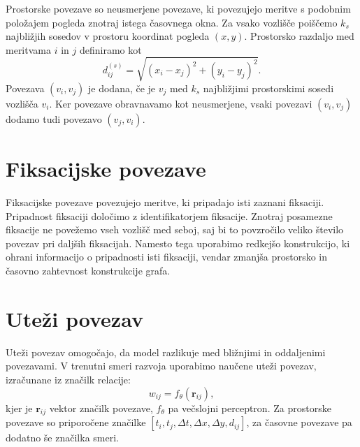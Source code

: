 Prostorske povezave so neusmerjene povezave, ki povezujejo meritve s podobnim položajem pogleda znotraj istega časovnega okna.
Za vsako vozlišče poiščemo $k_s$ najbližjih sosedov v prostoru koordinat pogleda $(x,y)$.
Prostorsko razdaljo med meritvama $i$ in $j$ definiramo kot
\begin{equation}
    d_{ij}^{(s)} =
    \sqrt{(x_i - x_j)^2 + (y_i - y_j)^2}.
\end{equation}
Povezava $(v_i, v_j)$ je dodana, če je $v_j$ med $k_s$ najbližjimi prostorskimi sosedi vozlišča $v_i$.
Ker povezave obravnavamo kot neusmerjene, vsaki povezavi $(v_i,v_j)$ dodamo tudi povezavo $(v_j,v_i)$.


\section{Fiksacijske povezave}
\label{subsec:fiksacijske-povezave}

Fiksacijske povezave povezujejo meritve, ki pripadajo isti zaznani fiksaciji.
Pripadnost fiksaciji določimo z identifikatorjem fiksacije.
Znotraj posamezne fiksacije ne povežemo vseh vozlišč med seboj, saj bi to povzročilo veliko število povezav pri daljših fiksacijah.
Namesto tega uporabimo redkejšo konstrukcijo, ki ohrani informacijo o pripadnosti isti fiksaciji, vendar zmanjša prostorsko in časovno zahtevnost konstrukcije grafa.


\section{Uteži povezav}
\label{subsec:utezi-povezav}

Uteži povezav omogočajo, da model razlikuje med bližnjimi in oddaljenimi povezavami.
V trenutni smeri razvoja uporabimo naučene uteži povezav, izračunane iz značilk relacije:
\begin{equation}
    w_{ij}=f_{\theta}(\mathbf{r}_{ij}),
\end{equation}
kjer je $\mathbf{r}_{ij}$ vektor značilk povezave, $f_{\theta}$ pa večslojni perceptron.
Za prostorske povezave so priporočene značilke $[t_i, t_j, \Delta t, \Delta x, \Delta y, d_{ij}]$, za časovne povezave pa dodatno še značilka smeri.


